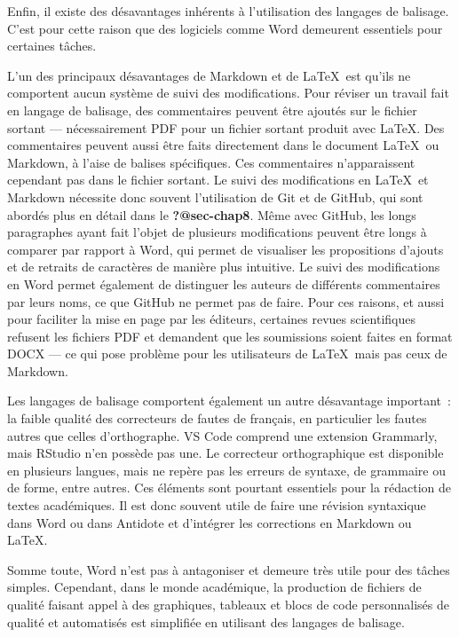 \documentclass[
  letterpaper,
]{scrbook}
\begin{document}
Enfin, il existe des désavantages inhérents à l'utilisation des langages
de balisage. C'est pour cette raison que des logiciels comme Word
demeurent essentiels pour certaines tâches.

L'un des principaux désavantages de Markdown et de \LaTeX~est qu'ils ne
comportent aucun système de suivi des modifications. Pour réviser un
travail fait en langage de balisage, des commentaires peuvent être
ajoutés sur le fichier sortant --- nécessairement PDF pour un fichier
sortant produit avec \LaTeX. Des commentaires peuvent aussi être faits
directement dans le document \LaTeX~ou Markdown, à l'aise de balises
spécifiques. Ces commentaires n'apparaissent cependant pas dans le
fichier sortant. Le suivi des modifications en \LaTeX~et Markdown
nécessite donc souvent l'utilisation de Git et de GitHub, qui sont
abordés plus en détail dans le \textbf{?@sec-chap8}. Même avec GitHub,
les longs paragraphes ayant fait l'objet de plusieurs modifications
peuvent être longs à comparer par rapport à Word, qui permet de
visualiser les propositions d'ajouts et de retraits de caractères de
manière plus intuitive. Le suivi des modifications en Word permet
également de distinguer les auteurs de différents commentaires par leurs
noms, ce que GitHub ne permet pas de faire. Pour ces raisons, et aussi
pour faciliter la mise en page par les éditeurs, certaines revues
scientifiques refusent les fichiers PDF et demandent que les soumissions
soient faites en format DOCX --- ce qui pose problème pour les
utilisateurs de \LaTeX~mais pas ceux de Markdown.

Les langages de balisage comportent également un autre désavantage
important~: la faible qualité des correcteurs de fautes de français, en
particulier les fautes autres que celles d'orthographe. VS Code comprend
une extension Grammarly, mais RStudio n'en possède pas une. Le
correcteur orthographique est disponible en plusieurs langues, mais ne
repère pas les erreurs de syntaxe, de grammaire ou de forme, entre
autres. Ces éléments sont pourtant essentiels pour la rédaction de
textes académiques. Il est donc souvent utile de faire une révision
syntaxique dans Word ou dans Antidote et d'intégrer les corrections en
Markdown ou \LaTeX.

Somme toute, Word n'est pas à antagoniser et demeure très utile pour des
tâches simples. Cependant, dans le monde académique, la production de
fichiers de qualité faisant appel à des graphiques, tableaux et blocs de
code personnalisés de qualité et automatisés est simplifiée en utilisant
des langages de balisage.
\end{document}
